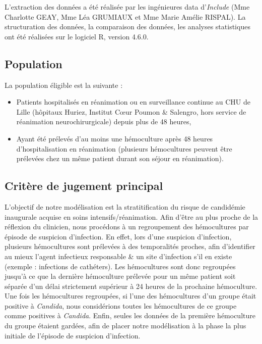 \documentclass[
  french,
  letterpaper,
  DIV=11,
  numbers=noendperiod,
  justified]{scrartcl}
\begin{document}
L'extraction des données a été réalisée par les ingénieures data
d'\emph{Include} (Mme Charlotte GEAY, Mme Léa GRUMIAUX et Mme Marie
Amélie RISPAL). La structuration des données, la comparaison des
données, les analyses statistiques ont été réalisées sur le logiciel R,
version 4.6.0.

\subsection{Population}\label{population}

La population éligible est la suivante :

\begin{itemize}
\item
  Patients hospitalisés en réanimation ou en surveillance continue au
  CHU de Lille (hôpitaux Huriez, Institut Cœur Poumon \& Salengro, hors
  service de réanimation neurochirurgicale) depuis plus de 48 heures,
\item
  Ayant été prélevés d'au moins une hémoculture après 48 heures
  d'hospitalisation en réanimation (plusieurs hémocultures peuvent être
  prélevées chez un même patient durant son séjour en réanimation).
\end{itemize}

\subsection{Critère de jugement
principal}\label{crituxe8re-de-jugement-principal}

L'objectif de notre modélisation est la stratitification du risque de
candidémie inaugurale acquise en soins intensifs/réanimation. Afin
d'être au plus proche de la réflexion du clinicien, nous procédons à un
regroupement des hémocultures par épisode de suspicion d'infection. En
effet, lors d'une suspicion d'infection, plusieurs hémocultures sont
prélevées à des temporalités proches, afin d'identifier au mieux l'agent
infectieux responsable \& un site d'infection s'il en existe (exemple :
infections de cathéters). Les hémocultures sont donc regroupées jusqu'à
ce que la dernière hémoculture prélevée pour un même patient soit
séparée d'un délai strictement supérieur à 24 heures de la prochaine
hémoculture. Une fois les hémocultures regroupées, si l'une des
hémocultures d'un groupe était positive à \emph{Candida}, nous
considérions toutes les hémocultures de ce groupe comme positives à
\emph{Candida}. Enfin, seules les données de la première hémoculture du
groupe étaient gardées, afin de placer notre modélisation à la phase la
plus initiale de l'épisode de suspicion d'infection.
\end{document}
